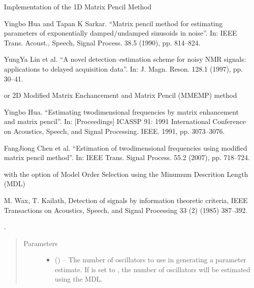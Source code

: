 \documentclass[letterpaper,10pt,english]{sphinxmanual}
\begin{document}
\begin{fulllineitems}
\begin{fulllineitems}
\label{\detokenize{references/core:nmrespy.core.Estimator.matrix_pencil}}
\sphinxAtStartPar
Implementation of the 1D Matrix Pencil Method %
\begin{footnote}[1]\sphinxAtStartFootnote
Yingbo Hua and Tapan K Sarkar. “Matrix pencil method for
estimating parameters of exponentially damped/undamped sinusoids
in noise”. In: IEEE Trans. Acoust., Speech, Signal Process. 38.5
(1990), pp. 814–824.
%
\end{footnote} %
\begin{footnote}[2]\sphinxAtStartFootnote
Yung\sphinxhyphen{}Ya Lin et al. “A novel detection–estimation scheme for
noisy NMR signals: applications to delayed acquisition data”.
In: J. Magn. Reson. 128.1 (1997), pp. 30–41.
%
\end{footnote} or 2D
Modified Matrix Enchancement and Matrix Pencil (MMEMP) method %
\begin{footnote}[3]\sphinxAtStartFootnote
Yingbo Hua. “Estimating two\sphinxhyphen{}dimensional frequencies by matrix
enhancement and matrix pencil”. In: {[}Proceedings{]} ICASSP 91: 1991
International Conference on Acoustics, Speech, and Signal
Processing. IEEE. 1991, pp. 3073–3076.
%
\end{footnote}
%
\begin{footnote}[4]\sphinxAtStartFootnote
Fang\sphinxhyphen{}Jiong Chen et al. “Estimation of two\sphinxhyphen{}dimensional
frequencies using modified matrix pencil method”. In: IEEE Trans.
Signal Process. 55.2 (2007), pp. 718–724.
%
\end{footnote} with the option of Model Order Selection using the Minumum
Descrition Length (MDL) %
\begin{footnote}[5]\sphinxAtStartFootnote
M. Wax, T. Kailath, Detection of signals by information
theoretic criteria, IEEE Transactions on Acoustics, Speech, and
Signal Processing 33 (2) (1985) 387–392.
%
\end{footnote}.
\begin{quote}\begin{description}
\item[{Parameters}] \leavevmode\begin{itemize}
\item {} 
\sphinxAtStartPar
{} (\sphinxstyleliteralemphasis{\sphinxupquote{, }}) – The number of oscillators to use in generating a parameter
estimate. If  is set to , the number of oscillators will be
estimated using the MDL.


\end{itemize}
\end{description}
\end{quote}
\end{fulllineitems}
\end{fulllineitems}
\end{document}
